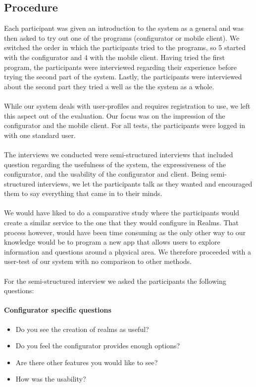 \subsection{Procedure} %
\label{sub:procedure}
Each participant was given an introduction to the system as a general and was then asked to try out one of the programs (configurator or mobile client). We switched the order in which the participants tried to the programs, so 5 started with the configurator and 4 with the mobile client. Having tried the first program, the participants were interviewed regarding their experience before trying the second part of the system. Lastly, the participants were interviewed about the second part they tried a well as the the system as a whole. 
\\\\
While our system deals with user-profiles and requires registration to use, we left this aspect out of the evaluation. Our focus was on the impression of the configurator and the mobile client. For all tests, the participants were logged in with one standard user.
\\\\
The interviews we conducted were semi-structured interviews that included question regarding the usefulness of the system, the expressiveness of the configurator, and the usability of the configurator and client. Being semi-structured interviews, we let the participants talk as they wanted and encouraged them to say everything that came in to their minds. 
\\\\
We would have liked to do a comparative study where the participants would create a similar service to the one that they would configure in Realms. That process however, would have been time consuming as the only other way to our knowledge would be to program a new app that allows users to explore information and questions around a physical area. We therefore proceeded with a user-test of our system with no comparison to other methods.
\\\\
For the semi-structured interview we asked the participants the following questions:

\paragraph{Configurator specific questions} %
\label{par:configurator_specific_questiosn}
\begin{itemize}
	\item Do you see the creation of realms as useful?
	\item Do you feel the configurator provides enough options?
	\item Are there other features you would like to see?
	\item How was the usability?
\end{itemize}

